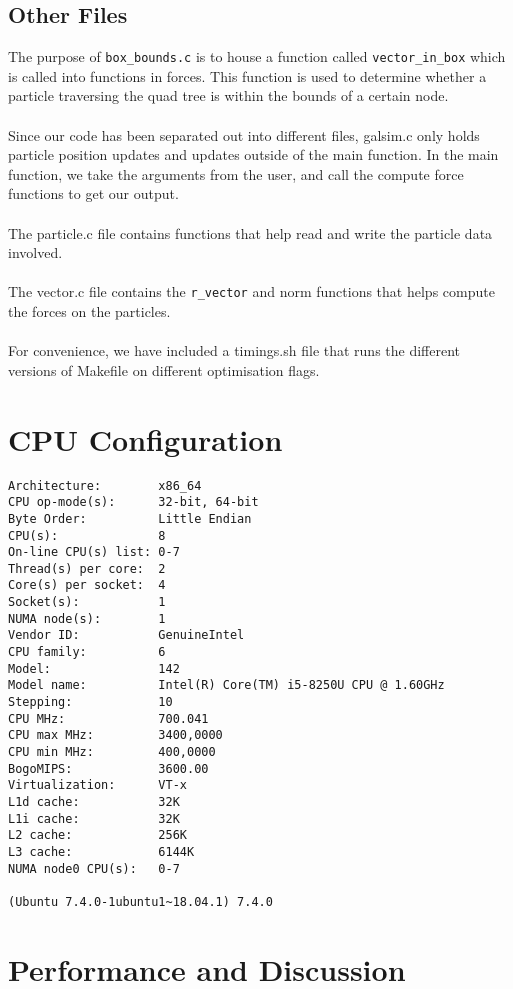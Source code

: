 \documentclass{article}
\begin{document}
\subsection{Other Files}
The purpose of \verb|box_bounds.c| is to house a function called \verb|vector_in_box| which is called into functions in forces. This function is used to determine whether a particle traversing the quad tree is within the bounds of a certain node. 
\\\\
Since our code has been separated out into different files, galsim.c only holds particle position updates and updates outside of the main function. In the main function, we take the arguments from the user, and call the compute force functions to get our output. 
\\\\
The particle.c file contains functions that help read and write the particle data involved.
\\\\
The vector.c file contains the \verb|r_vector| and norm functions that helps compute the forces on the particles. 
\\\\
For convenience, we have included a timings.sh file that runs the different versions of Makefile on different optimisation flags.
\section{CPU Configuration}
\begin{verbatim}
Architecture:        x86_64
CPU op-mode(s):      32-bit, 64-bit
Byte Order:          Little Endian
CPU(s):              8
On-line CPU(s) list: 0-7
Thread(s) per core:  2
Core(s) per socket:  4
Socket(s):           1
NUMA node(s):        1
Vendor ID:           GenuineIntel
CPU family:          6
Model:               142
Model name:          Intel(R) Core(TM) i5-8250U CPU @ 1.60GHz
Stepping:            10
CPU MHz:             700.041
CPU max MHz:         3400,0000
CPU min MHz:         400,0000
BogoMIPS:            3600.00
Virtualization:      VT-x
L1d cache:           32K
L1i cache:           32K
L2 cache:            256K
L3 cache:            6144K
NUMA node0 CPU(s):   0-7

(Ubuntu 7.4.0-1ubuntu1~18.04.1) 7.4.0

\end{verbatim}
\newpage
\section{Performance and Discussion}
\end{document}
